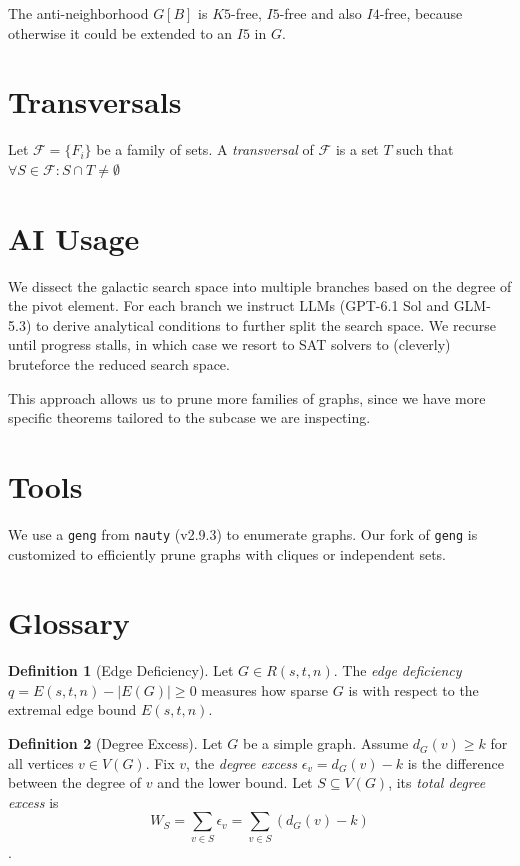 \documentclass[a4paper]{article}
\newcommand{\F}{\mathcal{F}}
\theoremstyle{definition}
\newtheorem{definition}{Definition}
\begin{document}
The anti-neighborhood $G[B]$ is $K5$-free, $I5$-free and also $I4$-free, because otherwise it could be extended to an $I5$ in $G$.

\section{Transversals}

Let $\F = \{ F_i \}$ be a family of sets. A \emph{transversal} of $\F$ is a set $T$ such that $\forall S \in \F \colon S \cap T \neq \emptyset$

\section{AI Usage}

We dissect the galactic search space into multiple branches based on the degree of the pivot element.
For each branch we instruct LLMs (GPT-6.1 Sol and GLM-5.3) to derive analytical conditions to further split the search space.
We recurse until progress stalls, in which case we resort to SAT solvers to (cleverly) bruteforce the reduced search space.

This approach allows us to prune more families of graphs, since we have more specific theorems tailored to the subcase we are inspecting.

\section{Tools}

We use a \texttt{geng} from \texttt{nauty} (v2.9.3) to enumerate graphs.
Our fork of \texttt{geng} is customized to efficiently prune graphs with cliques or independent sets.

\section*{Glossary}

\begin{definition}[Edge Deficiency]
	Let $G \in R(s, t, n)$.
	The \emph{edge deficiency} $q = E(s, t, n) - |E(G)| \geqslant 0$ measures how sparse $G$ is
	with respect to the extremal edge bound $E(s, t, n)$.
\end{definition}

\begin{definition}[Degree Excess]
	Let $G$ be a simple graph.
	Assume $d_G(v) \geqslant k$ for all vertices $v \in V(G)$.
	Fix $v$, the \emph{degree excess} $\epsilon_v = d_G(v) - k$ is the difference between the degree of $v$ and the lower bound.
	Let $S \subseteq V(G)$, its \emph{total degree excess} is $$W_S = \sum_{v \in S} \epsilon_v = \sum_{v \in S} \left( d_G(v) - k \right)$$.
\end{definition}
\end{document}
